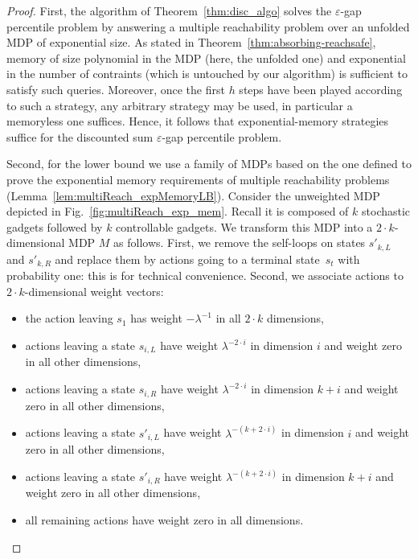 \documentclass{llncs}
\newcommand{\discount}{\ensuremath{\lambda} }
\begin{document}
\begin{proof}
First, the algorithm of Theorem~\ref{thm:disc_algo} solves the $\varepsilon$-gap percentile problem by answering a multiple reachability problem over an unfolded MDP of exponential size. As stated in Theorem~\ref{thm:absorbing-reachsafe}, memory of size polynomial in the MDP (here, the unfolded one) and exponential in the number of contraints (which is untouched by our algorithm) is sufficient to satisfy such queries. Moreover, once the first $h$ steps have been played according to such a strategy, any arbitrary strategy may be used, in particular a memoryless one suffices. Hence, it follows that exponential-memory strategies suffice for the discounted sum $\varepsilon$-gap percentile problem.

Second, for the lower bound we use a family of MDPs based on the one defined to prove the exponential memory requirements of multiple reachability problems (Lemma~\ref{lem:multiReach_expMemoryLB}). Consider the unweighted MDP depicted in Fig.~\ref{fig:multiReach_exp_mem}. Recall it is composed of $k$ stochastic gadgets followed by $k$ controllable gadgets. We transform this MDP into a $2\cdot k$-dimensional MDP $M$ as follows. First, we remove the self-loops on states $s'_{k,L}$ and $s'_{k,R}$ and replace them by actions going to a terminal state~$s_{t}$ with probability one: this is for technical convenience. Second, we associate actions to $2\cdot k$-dimensional weight vectors:
\begin{itemize}
\item the action leaving $s_{1}$ has weight $-\discount^{-1}$ in all $2\cdot k$ dimensions,
\item actions leaving a state $s_{i,L}$ have weight $\discount^{-2\cdot i}$ in dimension $i$ and weight zero in all other dimensions,
\item actions leaving a state $s_{i,R}$ have weight $\discount^{-2\cdot i}$ in dimension $k + i$ and weight zero in all other dimensions,
\item actions leaving a state $s'_{i,L}$ have weight $\discount^{-(k+ 2\cdot i)}$ in dimension $i$ and weight zero in all other dimensions,
\item actions leaving a state $s'_{i,R}$ have weight $\discount^{-(k+ 2\cdot i)}$ in dimension $k + i$ and weight zero in all other dimensions,
\item all remaining actions have weight zero in all dimensions.
\end{itemize}


\end{proof}
\end{document}
